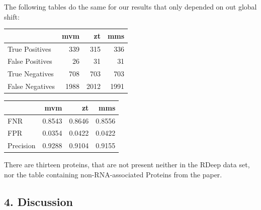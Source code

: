 \documentclass[
  12pt,
]{article}
\begin{document}
The following tables do the same for our results that only depended on
out global shift:

\begin{table}
\centering
\begin{tabular}{l|r|r|r}
\hline
  & mvm & zt & mms\\
\hline
True Positives & 339 & 315 & 336\\
\hline
False Positives & 26 & 31 & 31\\
\hline
True Negatives & 708 & 703 & 703\\
\hline
False Negatives & 1988 & 2012 & 1991\\
\hline
\end{tabular}
\end{table}

\begin{table}
\centering
\begin{tabular}{l|r|r|r}
\hline
  & mvm & zt & mms\\
\hline
FNR & 0.8543 & 0.8646 & 0.8556\\
\hline
FPR & 0.0354 & 0.0422 & 0.0422\\
\hline
Precision & 0.9288 & 0.9104 & 0.9155\\
\hline
\end{tabular}
\end{table}

There are thirteen proteins, that are not present neither in the RDeep
data set, nor the table containing non-RNA-associated Proteins from the
paper.

\hypertarget{discussion}{%
\subsection{4. Discussion}\label{discussion}}
\end{document}
